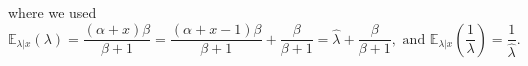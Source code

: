 \documentclass[11pt]{report}
\begin{document}
where we used 
$$\mathbb{E}_{\lambda|x}\left(\lambda\right) = \frac{(\alpha +x)\beta}{\beta+1} = \frac{(\alpha +x - 1)\beta}{\beta+1} + \frac{\beta}{\beta+1} = \widehat{\lambda} + \frac{\beta}{\beta+1},\text{ and } \mathbb{E}_{\lambda|x}\left(\frac{1}{\lambda}\right) = \frac{1}{\widehat{\lambda}}. $$


\end{document}
